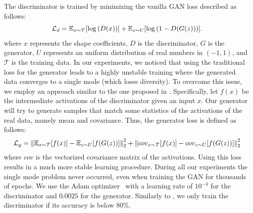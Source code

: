 The discriminator is trained by minimizing the vanilla GAN loss described as follows:
\begin{equation}\label{eqn:gan}
	\mathcal{L}_d = \mathbb{E}_{x\sim{\cal T}} [ \log \left(D(x)\right) ] + \mathbb{E}_{z\sim U} [ \log \left(1-D(G(z))\right) ].
\end{equation}
where $x$ represents the shape coefficients, $D$ is the discriminator, $G$ is the generator, $U$ represents an uniform distribution of real numbers in $(-1, 1)$,
and $\mathcal{T}$ is the training data.
In our experiments, we noticed that using the traditional loss for the generator leads to a highly
unstable training where the generated data converges to a single mode (which loses diversity).
To overcome this issue, we employ an approach similar to the one proposed in \cite{improvedGAN}.
Specifically, let $f(x)$ be the intermediate activations of the discriminator given an input $x$.
Our generator will try to generate samples that match some statistics of the activations of
the real data, namely mean and covariance.
Thus, the generator loss is defined as follows:
\begin{equation}\label{eqn:generator}
	\mathcal{L}_g = \left\lVert\mathbb{E}_{x\sim{\cal T}} [ f(x) ] - \mathbb{E}_{z\sim U} [ f(G(z)) ]\right\rVert_2^2 +
					\left\lVert cov_{x\sim{\cal T}} [ f(x) ] - cov_{z\sim U} [ f(G(z)) ]\right\rVert_2^2
\end{equation}
where $cov$ is the vectorized covariance matrix of the activations.
Using this loss results in a much more stable learning procedure.
During all our experiments the single mode problem never occurred, even when
training the GAN for thousands of epochs.
We use the Adam optimizer~\cite{Adam} with a learning rate of $10^{-4}$ for the discriminator and $0.0025$ for the
generator.
Similarly to \cite{wu2016learning}, we only train the discriminator if its accuracy is below 80\%.

